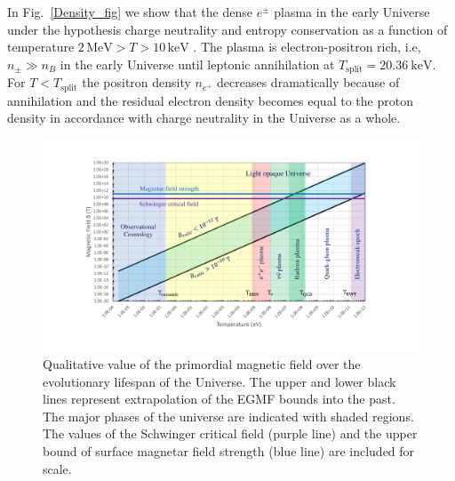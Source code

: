 \documentclass[universe,article,submit,moreauthors,pdftex,a4paper]{Definitions/mdpi}
\newcommand*{\rf}[1]{Fig.~{\ref{#1}}}
\begin{document}
In \rf{Density_fig} we show that the dense $e^{\pm}$ plasma in the early Universe under the hypothesis charge neutrality and entropy conservation as a function of temperature $2\,\mathrm{MeV}>T>10\,\mathrm{keV}$ \cite{Chris:2023abc}. The plasma is electron-positron rich, i.e, $n_{\pm}\gg n_B$ in the early Universe until leptonic annihilation at $T_{\mathrm{split}} = 20.36\ \mathrm{keV}$. For $T<T_{\mathrm{split}}$ the positron density $n_{e^+}$ decreases dramatically because of annihilation and the residual electron density becomes equal to the proton density in accordance with charge neutrality in the Universe as a whole.
\begin{figure}[htbp]
  \centering  \includegraphics[trim=110 50 120 40,clip,width=\textwidth]{./plots/relic_plot.PDF}
  \caption{Qualitative value of the primordial magnetic field over the evolutionary lifespan of the Universe. The upper and lower black lines represent extrapolation of the EGMF bounds into the past. The major phases of the universe are indicated with shaded regions. The values of the Schwinger critical field (purple line) and the upper bound of surface magnetar field strength (blue line) are included for scale.\label{relic_plot}}
\end{figure}
\end{document}

